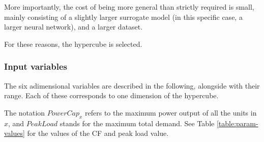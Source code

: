 More importantly, the cost of being more general than strictly required is small, mainly consisting of a slightly larger surrogate model (in this specific case, a larger neural network), and a larger dataset.

For these reasons, the hypercube is selected.

\subsubsection{Input variables}

The six adimensional variables are described in the following, alongside with their range. Each of these corresponds to one dimension of the hypercube.

The notation $PowerCap_{x}$ refers to the maximum power output of all the units in $x$, and $PeakLoad$ stands for the maximum total demand. See Table \ref{table:param-values} for the values of the CF and peak load value.


